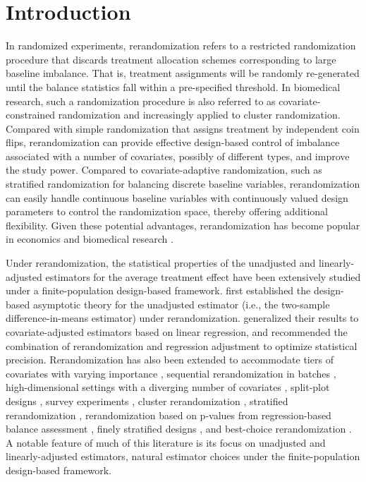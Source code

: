 \documentclass[12pt]{article}
\begin{document}
\section{Introduction}
In randomized experiments, rerandomization \citep{morgan2012rerandomization} refers to a restricted randomization procedure that discards treatment allocation schemes corresponding to large baseline imbalance. That is, treatment assignments will be randomly re-generated until the balance statistics fall within a pre-specified threshold. In biomedical research, such a randomization procedure is also referred to as covariate-constrained randomization \citep{li2016evaluation,li2017evaluation} and increasingly applied to cluster randomization. Compared with simple randomization that assigns treatment by independent coin flips, rerandomization can provide effective design-based control of imbalance associated with a number of covariates, possibly of different types, and improve the study power. Compared to covariate-adaptive randomization, such as stratified randomization \citep{Zelen1974} for balancing discrete baseline variables, rerandomization can easily handle continuous baseline variables with continuously valued design parameters to control the randomization space, thereby offering additional flexibility. Given these potential advantages, rerandomization has become popular in economics \citep{bruhn2009pursuit} and biomedical research \citep{ivers2012allocation}.

Under rerandomization, the statistical properties of the unadjusted and linearly-adjusted estimators for the average treatment effect have been extensively studied under a finite-population design-based framework. \cite{li2018asymptotic} first established the design-based asymptotic theory for the unadjusted estimator (i.e., the two-sample difference-in-means estimator) under rerandomization. \cite{li2020rerandomization} generalized their results to covariate-adjusted estimators based on linear regression, and recommended the combination of rerandomization and regression adjustment to optimize statistical precision. Rerandomization has also been extended to accommodate tiers of covariates with varying importance \citep{morgan2015rerandomization}, sequential rerandomization in batches \citep{zhou2018sequential}, high-dimensional settings with a diverging number of covariates \citep{wang2022rerandomization}, split-plot designs \citep{shi2022rerandomization}, {survey experiments \citep{cytrynbaum2021optimal, yang2023rejective},} cluster rerandomization \citep{lu2023design}, stratified rerandomization \citep{wang2023rerandomization}, rerandomization based on p-values from regression-based balance assessment \citep{zhao2024no}, {finely stratified designs \citep{bai2022optimality,cytrynbaum2024finely}}, {and best-choice rerandomization \citep{WangLi2025}}.  A notable feature of much of this literature is its focus on unadjusted and linearly-adjusted estimators, natural estimator choices under the finite-population design-based framework. 
\end{document}
